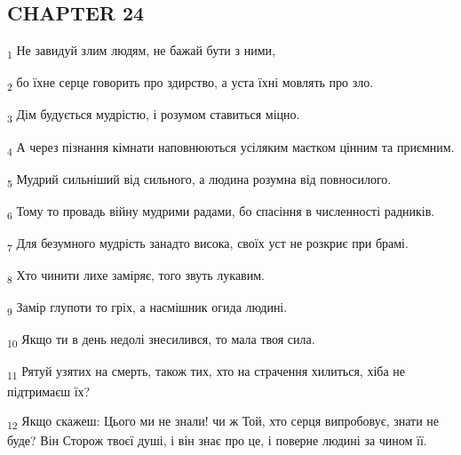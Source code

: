 \subsection{CHAPTER 24}
\begin{tcolorbox}
\textsubscript{1} Не завидуй злим людям, не бажай бути з ними,
\end{tcolorbox}
\begin{tcolorbox}
\textsubscript{2} бо їхне серце говорить про здирство, а уста їхні мовлять про зло.
\end{tcolorbox}
\begin{tcolorbox}
\textsubscript{3} Дім будується мудрістю, і розумом ставиться міцно.
\end{tcolorbox}
\begin{tcolorbox}
\textsubscript{4} А через пізнання кімнати наповнюються усіляким маєтком цінним та приємним.
\end{tcolorbox}
\begin{tcolorbox}
\textsubscript{5} Мудрий сильніший від сильного, а людина розумна від повносилого.
\end{tcolorbox}
\begin{tcolorbox}
\textsubscript{6} Тому то провадь війну мудрими радами, бо спасіння в численності радників.
\end{tcolorbox}
\begin{tcolorbox}
\textsubscript{7} Для безумного мудрість занадто висока, своїх уст не розкриє при брамі.
\end{tcolorbox}
\begin{tcolorbox}
\textsubscript{8} Хто чинити лихе заміряє, того звуть лукавим.
\end{tcolorbox}
\begin{tcolorbox}
\textsubscript{9} Замір глупоти то гріх, а насмішник огида людині.
\end{tcolorbox}
\begin{tcolorbox}
\textsubscript{10} Якщо ти в день недолі знесилився, то мала твоя сила.
\end{tcolorbox}
\begin{tcolorbox}
\textsubscript{11} Рятуй узятих на смерть, також тих, хто на страчення хилиться, хіба не підтримаєш їх?
\end{tcolorbox}
\begin{tcolorbox}
\textsubscript{12} Якщо скажеш: Цього ми не знали! чи ж Той, хто серця випробовує, знати не буде? Він Сторож твоєї душі, і він знає про це, і поверне людині за чином її.
\end{tcolorbox}
